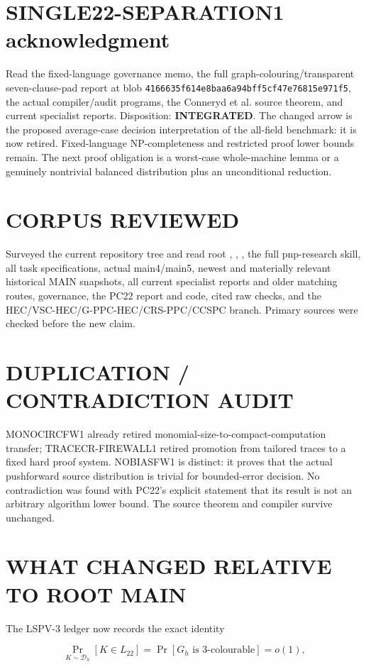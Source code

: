 \documentclass[11pt]{article}
\newcommand{\Ltwo}{L_{22}}
\begin{document}
\section{SINGLE22-SEPARATION1 acknowledgment}
Read the fixed-language governance memo, the full graph-colouring/transparent
seven-clause-pad report at blob
\texttt{4166635f614e8baa6a94bff5cf47e76815e971f5}, the actual compiler/audit
programs, the Conneryd et al. source theorem, and current specialist reports.
Disposition: \textbf{INTEGRATED}.  The changed arrow is the proposed
average-case decision interpretation of the all-field benchmark: it is now
retired.  Fixed-language NP-completeness and restricted proof lower bounds
remain.  The next proof obligation is a worst-case whole-machine lemma or a
genuinely nontrivial balanced distribution plus an unconditional reduction.

\section{CORPUS REVIEWED}
Surveyed the current repository tree and read root ,
, , the full pnp-research skill, all task
specifications, actual main4/main5, newest and materially relevant historical
MAIN snapshots, all current specialist reports and older matching routes,
governance, the PC22 report and code, cited raw checks, and the
HEC/VSC-HEC/G-PPC-HEC/CRS-PPC/CCSPC branch.  Primary sources
\cite{conneryd,lauria} were checked before the new claim.

\section{DUPLICATION / CONTRADICTION AUDIT}
MONOCIRCFW1 already retired monomial-size-to-compact-computation transfer;
TRACECR-FIREWALL1 retired promotion from tailored traces to a fixed hard proof
system.  NOBIASFW1 is distinct: it proves that the actual pushforward source
distribution is trivial for bounded-error decision.  No contradiction was
found with PC22's explicit statement that its result is not an arbitrary
algorithm lower bound.  The source theorem and compiler survive unchanged.

\section{WHAT CHANGED RELATIVE TO ROOT MAIN}
The LSPV-3 ledger now records the exact identity

\[
 \Pr_{K\sim\mathcal D_h}[K\in\Ltwo]
 =\Pr[G_h\text{ is 3-colourable}]=o(1),
\]
\end{document}
